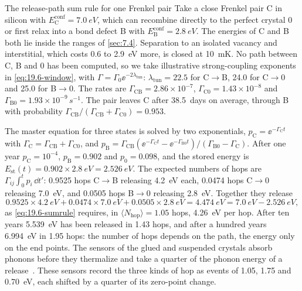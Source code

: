 \begin{workedexample}{The release-path sum rule for one Frenkel pair}\label{we:19-sumrule}
Take a close Frenkel pair C in silicon with $E^{\mathrm{conf}}_{\mathrm{C}} = \SI{7.0}{eV}$, which can recombine directly to the perfect crystal 0 or first relax into a bond defect B with $E^{\mathrm{conf}}_{\mathrm{B}} = \SI{2.8}{eV}$. The energies of C and B both lie inside the ranges of \cref{sec:7.4}. Separation to an isolated vacancy and interstitial, which costs 0.6 to \SI{2.9}{eV} more, is closed at \SI{10}{mK}. No path between C, B and 0 has been computed, so we take illustrative strong-coupling exponents in \cref{eq:19.6-window}, with $\varGamma = \varGamma_0\ee^{-2\lambda_{\mathrm{tun}}}$: $\lambda_{\mathrm{tun}} = 22.5$ for C$\to$B, 24.0 for C$\to$0 and 25.0 for B$\to$0. The rates are $\varGamma_{\mathrm{CB}} = 2.86\times10^{-7}$, $\varGamma_{\mathrm{C0}} = 1.43\times10^{-8}$ and $\varGamma_{\mathrm{B0}} = 1.93\times10^{-9}\,\si{s^{-1}}$. The pair leaves C after \SI{38.5}{days} on average, through B with probability $\varGamma_{\mathrm{CB}}/(\varGamma_{\mathrm{CB}} + \varGamma_{\mathrm{C0}}) = 0.953$.

The master equation for three states is solved by two exponentials, $p_{\mathrm{C}} = \ee^{-\varGamma_{\mathrm{C}}t}$ with $\varGamma_{\mathrm{C}} = \varGamma_{\mathrm{CB}} + \varGamma_{\mathrm{C0}}$, and $p_{\mathrm{B}} = \varGamma_{\mathrm{CB}}(\ee^{-\varGamma_{\mathrm{C}}t} - \ee^{-\varGamma_{\mathrm{B0}}t})/(\varGamma_{\mathrm{B0}} - \varGamma_{\mathrm{C}})$. After one year $p_{\mathrm{C}} = 10^{-4}$, $p_{\mathrm{B}} = 0.902$ and $p_0 = 0.098$, and the stored energy is $E_{\mathrm{st}}(t) = 0.902\times\SI{2.8}{eV} = \SI{2.526}{eV}$. The expected numbers of hops are $\varGamma_{ij}\int_0^t p_i\,\dd t'$: 0.9525 hops C$\to$B releasing \SI{4.2}{eV} each, 0.0474 hops C$\to$0 releasing \SI{7.0}{eV}, and 0.0505 hops B$\to$0 releasing \SI{2.8}{eV}. Together they release
\begin{equation*}
  0.9525\times\SI{4.2}{eV} + 0.0474\times\SI{7.0}{eV} + 0.0505\times\SI{2.8}{eV} = \SI{4.474}{eV} = \SI{7.0}{eV} - \SI{2.526}{eV} ,
\end{equation*}
as \cref{eq:19.6-sumrule} requires, in $\langle N_{\mathrm{hop}}\rangle = 1.05$ hops, \SI{4.26}{eV} per hop. After ten years \SI{5.539}{eV} has been released in 1.43 hops, and after a hundred years \SI{6.994}{eV} in 1.95 hops: the number of hops depends on the path, the energy only on the end points. The sensors of the glued and suspended crystals absorb phonons before they thermalize and take a quarter of the phonon energy of a release~\cite{anthonypetersen2024stress}. These sensors record the three kinds of hop as events of 1.05, 1.75 and \SI{0.70}{eV}, each shifted by a quarter of its zero-point change.
\end{workedexample}

